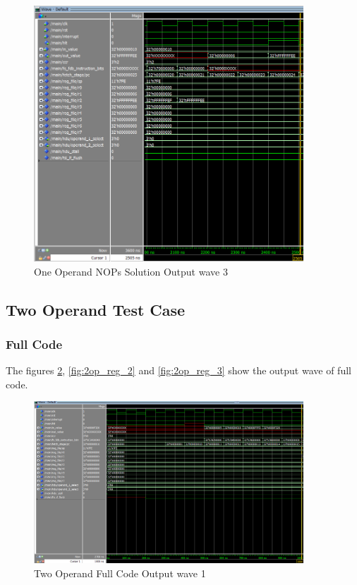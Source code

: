 \begin{figure}[H]
    \centering
    \includegraphics[width=0.9\textwidth]{images/test_cases/one_operand/OneOperand_NOP_3.PNG}
    \caption{One Operand NOPs Solution Output wave 3}
    \label{fig:1op_nop_3}
\end{figure}


\subsection{Two Operand Test Case}

\subsubsection{Full Code}
The figures \ref{fig:2op_reg_1}, \ref{fig:2op_reg_2} and \ref{fig:2op_reg_3} show the output wave of full code.
\begin{figure}[H]
    \centering
    \includegraphics[width=0.9\textwidth]{images/test_cases/two_operand/TwoOperand_regular_1.PNG}
    \caption{Two Operand Full Code Output wave 1}
    \label{fig:2op_reg_1}
\end{figure}

